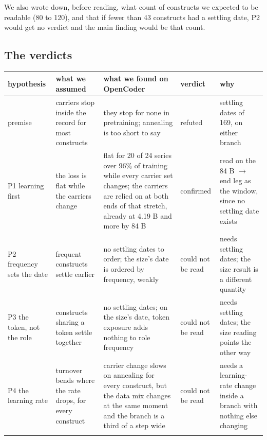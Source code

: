 \documentclass{article}
\begin{document}
We also wrote down, before reading, what count of constructs we expected to be readable (80 to 120), and that if fewer than 43 constructs had a settling date, P2 would get no verdict and the main finding would be that count.

\subsection{The verdicts}

\begin{table}[t]
\centering
\scriptsize
\renewcommand{\arraystretch}{1.25}
\begin{tabular}{@{}>{\raggedright\arraybackslash}p{0.2000\dimexpr\textwidth-8\tabcolsep\relax}>{\raggedright\arraybackslash}p{0.2000\dimexpr\textwidth-8\tabcolsep\relax}>{\raggedright\arraybackslash}p{0.2000\dimexpr\textwidth-8\tabcolsep\relax}>{\raggedright\arraybackslash}p{0.2000\dimexpr\textwidth-8\tabcolsep\relax}>{\raggedright\arraybackslash}p{0.2000\dimexpr\textwidth-8\tabcolsep\relax}@{}}
\toprule
hypothesis & what we assumed & what we found on OpenCoder & verdict & why \\
\midrule
premise & carriers stop inside the record for most constructs & they stop for none in pretraining; annealing is too short to say & refuted & 0 settling dates of 169, on either branch \\\addlinespace[2.5pt]
P1 learning first & the loss is flat while the carriers change & flat for 20 of 24 series over 96\% of training while every carrier set changes; the carriers are relied on at both ends of that stretch, already at 4.19 B and more by 84 B & confirmed & read on the 84 B $\rightarrow$ end leg as the window, since no settling date exists \\\addlinespace[2.5pt]
P2 frequency sets the date & frequent constructs settle earlier & no settling dates to order; the size's date is ordered by frequency, weakly & could not be read & needs settling dates; the size result is a different quantity \\\addlinespace[2.5pt]
P3 the token, not the role & constructs sharing a token settle together & no settling dates; on the size's date, token exposure adds nothing to role frequency & could not be read & needs settling dates; the size reading points the other way \\\addlinespace[2.5pt]
P4 the learning rate & turnover bends where the rate drops, for every construct & carrier change slows on annealing for every construct, but the data mix changes at the same moment and the branch is a third of a step wide & could not be read & needs a learning-rate change inside a branch with nothing else changing \\\addlinespace[2.5pt]

\end{tabular}
\end{table}
\end{document}

